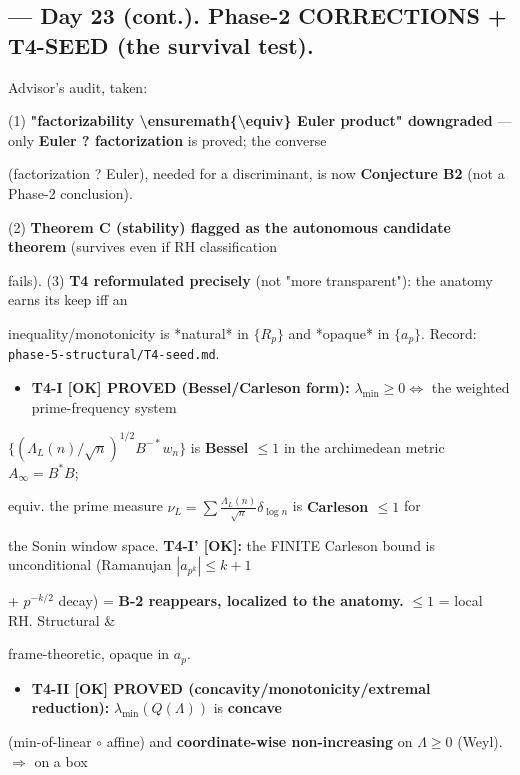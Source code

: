 \documentclass[10pt]{article}
\begin{document}
\subsection*{ --- Day 23 (cont.). Phase-2 CORRECTIONS + T4-SEED (the survival test).}
Advisor's audit, taken:\par
(1) \textbf{"factorizability \textbackslash{}ensuremath\{\textbackslash{}equiv\} Euler product" downgraded} --- only \textbf{Euler ? factorization} is proved; the converse\par
(factorization ? Euler), needed for a discriminant, is now \textbf{Conjecture B2} (not a Phase-2 conclusion).\par
(2) \textbf{Theorem C (stability) flagged as the autonomous candidate theorem} (survives even if RH classification\par
fails). (3) \textbf{T4 reformulated precisely} (not "more transparent"): the anatomy earns its keep iff an\par
inequality/monotonicity is *natural* in $\{R_p\}$ and *opaque* in $\{a_p\}$. Record: \texttt{phase-5-structural/T4-seed.md}.\par
\begin{itemize}
\item \textbf{T4-I [OK] PROVED (Bessel/Carleson form):} $\lambda_{\min}\ge0\iff$ the weighted prime-frequency system
\end{itemize}
  $\{(\Lambda_L(n)/\sqrt n)^{1/2}B^{-*}w_n\}$ is \textbf{Bessel $\le1$} in the archimedean metric $A_\infty=B^*B$;\par
  equiv. the prime measure $\nu_L=\sum\frac{\Lambda_L(n)}{\sqrt n}\delta_{\log n}$ is \textbf{Carleson $\le1$} for\par
  the Sonin window space. \textbf{T4-I' [OK]:} the FINITE Carleson bound is unconditional (Ramanujan $|a_{p^k}|\le k+1$\par
  + $p^{-k/2}$ decay) = \textbf{B-2 reappears, localized to the anatomy.} $\le1$ = local RH. Structural \&\par
  frame-theoretic, opaque in $a_p$.\par
\begin{itemize}
\item \textbf{T4-II [OK] PROVED (concavity/monotonicity/extremal reduction):} $\lambda_{\min}(Q(\Lambda))$ is \textbf{concave}
\end{itemize}
  (min-of-linear \ensuremath{\circ} affine) and \textbf{coordinate-wise non-increasing} on $\Lambda\ge0$ (Weyl). \ensuremath{\Rightarrow} on a box\par
\end{document}
